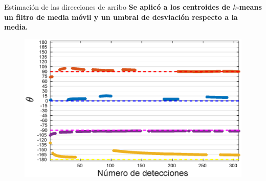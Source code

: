 \documentclass[12pt,aspectratio=169]{beamer}
\begin{document}
	\begin{frame}{Estimación de las direcciones de arribo}
		\textbf{Se aplicó a los centroides de $k$-means un filtro de media móvil y un umbral de desviación respecto a la media.}
		
		\begin{figure}[h]
			\centering
			\includegraphics[width=0.65\linewidth]{figures/plot4color}
		\end{figure}
	\end{frame}
	
%		
	
%		
%	
%		
	
\end{document}
